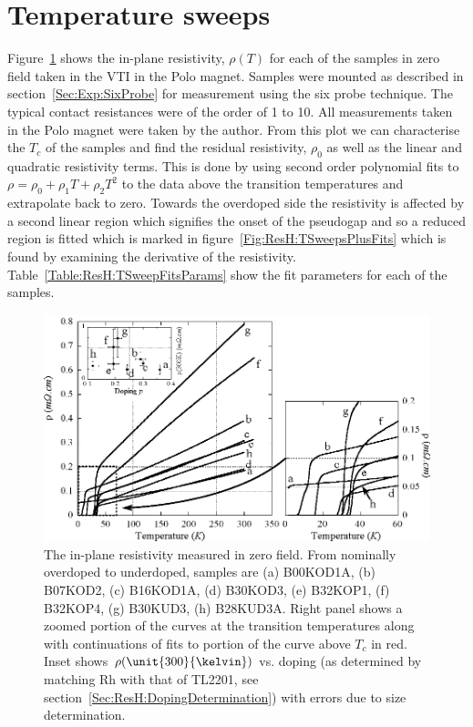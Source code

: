 \section{Temperature sweeps}

Figure~\ref{Fig:ResH:TSweeps} shows the in-plane resistivity, $\rho(T)$ for each of the samples in zero field taken in the \ac{VTI} in the Polo magnet. Samples were mounted as described in section~\ref{Sec:Exp:SixProbe} for measurement using the six probe technique. The typical contact resistances were of the order of \unit{1}{\ohm} to \unit{10}{\ohm}. All measurements taken in the Polo magnet were taken by the author. From this plot we can characterise the $T_c$ of the samples and find the residual resistivity, $\rho_0$ as well as the linear and quadratic resistivity terms. This is done by using second order polynomial fits to $\rho = \rho_0 + \rho_1 T + \rho_2 T^2$ to the data above the transition temperatures and extrapolate back to zero. Towards the overdoped side the resistivity is affected by a second linear region which signifies the onset of the pseudogap and so a reduced region is fitted which is marked in figure~\ref{Fig:ResH:TSweepsPlusFits} which is found by examining the derivative of the resistivity.  Table~\ref{Table:ResH:TSweepFitsParams} show the fit parameters for each of the samples. 
\begin{figure}[htbp]
	\begin{center}
		\includegraphics[scale=1.0]{Chapter-HallBSCO/Figures/TSweeps/TSweeps}
		\caption{The in-plane resistivity measured in zero field. From nominally overdoped to underdoped, samples are (a) B00KOD1A, (b) B07KOD2, (c) B16KOD1A, (d) B30KOD3, (e) B32KOP1, (f) B32KOP4, (g) B30KUD3, (h) B28KUD3A. Right panel shows a zoomed portion of the curves at the transition temperatures along with continuations of fits to portion of the curve above $T_c$ in red. Inset shows $\rho(\unit{300}{\kelvin})$ vs. doping (as determined by matching Rh with that of \ac{TL2201}, see section~\ref{Sec:ResH:DopingDetermination}) with errors due to size determination.}
		\label{Fig:ResH:TSweeps}
	\end{center}
\end{figure}
